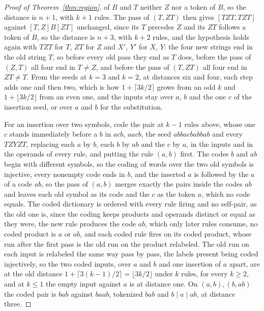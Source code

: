 \documentclass[11pt,a4paper]{article}
\theoremstyle{definition}
\theoremstyle{plain}
\begin{document}
\begin{proof}[Proof of Theorem~\ref{thm:region}]
of \(B\) and \(T\) neither \(Z\) nor a token of \(B\), so the distance is \(n + 1\), with \(k + 1\) rules. The pass of
\((T, ZT)\) then gives \([TZT, TZT]\) against \([T, Z] B [ZT]\) unchanged, since its \(T\) precedes \(Z\) and its \(ZT\)
follows a token of \(B\), so the distance is \(n + 3\), with \(k + 2\) rules, and the hypothesis holds again with
\(TZT\) for \(T\), \(ZT\) for \(Z\) and \(X'\), \(Y'\) for \(X\), \(Y\): the four new strings end in the old string
\(T\), so before every old pass they end as \(T\) does, before the pass of \((Z, T)\) all four end in \(T \ne Z\), and
before the pass of \((T, ZT)\) all four end in \(ZT \ne T\). From the seeds at \(k = 3\) and \(k = 2\), at distances six
and four, each step adds one and then two, which is how \(1 + \lceil 3k/2 \rceil\) grows from an odd \(k\) and
\(1 + \lfloor 3k/2 \rfloor\) from an even one, and the inputs stay over \(a\), \(b\) and the one \(c\) of the insertion
seed, or over \(a\) and \(b\) for the substitution.

For an insertion over two symbols, code the pair at \(k - 1\) rules above, whose one \(c\) stands immediately before a
\(b\) in \(acb\), \(aacb\), the seed \(abbacbabbab\) and every \(TZYZT\), replacing each \(a\) by \(b\), each \(b\) by
\(ab\) and the \(c\) by \(a\), in the inputs and in the operands of every rule, and putting the rule \((a, b)\) first.
The codes \(b\) and \(ab\) begin with different symbols, so the coding of words over the two old symbols is injective,
every nonempty code ends in \(b\), and the inserted \(a\) is followed by the \(a\) of a code \(ab\), so the pass of
\((a, b)\) merges exactly the pairs inside the codes \(ab\) and leaves each old symbol as its code and the \(c\) as the
token \(a\), which no code equals. The coded dictionary is ordered with every rule firing and no self-pair, as the old
one is, since the coding keeps products and operands distinct or equal as they were, the new rule produces the code
\(ab\), which only later rules consume, no coded product is \(a\) or \(ab\), and each coded rule fires on its coded
product, whose run after the first pass is the old run on the product relabeled. The old run on each input is relabeled
the same way pass by pass, the labels present being coded injectively, so the two coded inputs, over \(a\) and \(b\) and
one insertion of \(a\) apart, are at the old distance \(1 + \lceil 3(k - 1)/2 \rceil = \lfloor 3k/2 \rfloor\) under
\(k\) rules, for every \(k \ge 2\), and at \(k \le 1\) the empty input against \(a\) is at distance one. On
\((a, b), (b, ab)\) the coded pair is \(bab\) against \(baab\), tokenized \(bab\) and \(b \mid a \mid ab\), at distance
three.
\end{proof}
\end{document}
